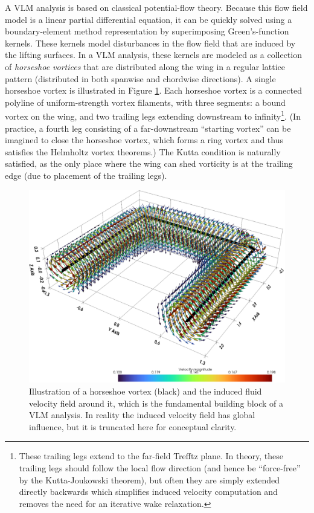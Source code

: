 A VLM analysis is based on classical potential-flow theory. Because this flow field model is a linear partial differential equation, it can be quickly solved using a boundary-element method representation by superimposing Green's-function kernels. These kernels model disturbances in the flow field that are induced by the lifting surfaces. In a VLM analysis, these kernels are modeled as a collection of \emph{horseshoe vortices} that are distributed along the wing in a regular lattice pattern (distributed in both spanwise and chordwise directions). A single horseshoe vortex is illustrated in Figure \ref{fig:horseshoe_vortex}. Each horseshoe vortex is a connected polyline of uniform-strength vortex filaments, with three segments: a bound vortex on the wing, and two trailing legs extending downstream to infinity\footnote{These trailing legs extend to the far-field Trefftz plane. In theory, these trailing legs should follow the local flow direction (and hence be ``force-free'' by the Kutta-Joukowski theorem), but often they are simply extended directly backwards which simplifies induced velocity computation and removes the need for an iterative wake relaxation.}. (In practice, a fourth leg consisting of a far-downstream ``starting vortex'' can be imagined to close the horseshoe vortex, which forms a ring vortex and thus satisfies the Helmholtz vortex theorems.) The Kutta condition is naturally satisfied, as the only place where the wing can shed vorticity is at the trailing edge (due to placement of the trailing legs).

\begin{figure}[h]
    \centering
    \includegraphics[width=5in]{../figures/horseshoe_vortex.png}
    \caption{Illustration of a horseshoe vortex (black) and the induced fluid velocity field around it, which is the fundamental building block of a VLM analysis. In reality the induced velocity field has global influence, but it is truncated here for conceptual clarity.}
    \label{fig:horseshoe_vortex}
\end{figure}


